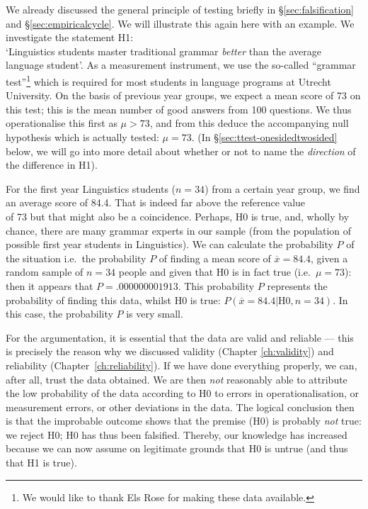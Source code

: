 \documentclass[
]{book}
\begin{document}
We already discussed the general principle of testing briefly in
§\ref{sec:falsification} and §\ref{sec:empiricalcycle}.
We will illustrate this again here
with an example. We investigate the statement H1:\\
`Linguistics students master traditional
grammar \emph{better} than the average language student'. As a measurement instrument,
we use the so-called ``grammar test''\footnote{We would like to thank Els Rose for making these data available.} which is required for most students
in language programs at Utrecht University. On the basis of previous year groups,
we expect a mean score of 73 on this test; this is the mean number of good answers
from 100 questions. We thus operationalise this first as \(\mu > 73\), and from this deduce
the accompanying null hypothesis which is actually tested:
\(\mu = 73\).
(In §\ref{sec:ttest-onesidedtwosided} below, we will go into more detail
about whether or not to name the \emph{direction} of the difference in H1).

For the first year Linguistics students (\(n=34\)) from a certain year group,
we find an average score of 84.4. That is indeed far above the reference value\\
of 73 but that might also be a coincidence.
Perhaps, H0 is true, and, wholly by chance, there are many grammar experts
in our sample (from the population of possible first year students
in Linguistics). We can calculate the probability \(P\) of the situation
i.e.~the probability \(P\) of finding a mean score of \(\overline{x}=84.4\),
given a random sample of \(n=34\) people and given that
H0 is in fact true (i.e.~\(\mu=73\)): then it appears that
\(P=.000000001913\). This probability \(P\) represents the probability of finding this
data, whilst H0 is true:
\(P(\overline{x}=84.4|\textrm{H0},n=34)\). In this case, the probability \(P\)
is very small.

For the argumentation, it is essential that the data are valid and
reliable --- this is precisely the reason why we discussed validity
(Chapter \ref{ch:validity}) and reliability
(Chapter~\ref{ch:reliability}). If we have done everything properly,
we can, after all, trust the data obtained.
We are then \emph{not} reasonably able to attribute the low probability of the data according
to H0 to errors in operationalisation, or measurement errors, or other deviations in the data.
The logical conclusion then is that the improbable outcome shows that the
premise (H0) is probably \emph{not} true: we reject H0; H0 has thus been
falsified. Thereby, our knowledge has increased because we can now
assume on legitimate grounds that H0 is untrue (and thus that H1
is true).
\end{document}
